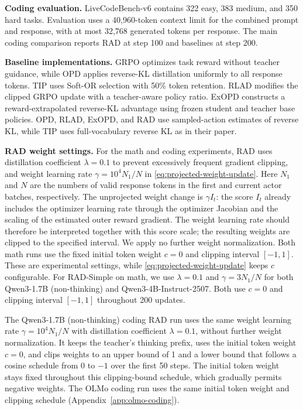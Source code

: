 \documentclass{article} %
\begin{document}
\noindent\textbf{Coding evaluation.}\enspace
LiveCodeBench-v6 contains 322 easy, 383 medium, and 350 hard tasks.
Evaluation uses a 40,960-token context limit for the combined prompt and
response, with at most 32,768 generated tokens per response. The main
coding comparison reports RAD at step 100 and baselines at step 200.


\noindent\textbf{Baseline implementations.}\enspace
GRPO optimizes task reward without teacher guidance, while OPD applies
reverse-KL distillation uniformly to all response tokens. TIP uses Soft-OR
selection with 50\% token retention. RLAD modifies the clipped GRPO update
with a teacher-aware policy ratio. ExOPD constructs a reward-extrapolated
reverse-KL advantage using frozen student and teacher base policies.
OPD, RLAD, ExOPD, and RAD use sampled-action estimates of reverse KL,
while TIP uses full-vocabulary reverse KL as in their paper.

\noindent\textbf{RAD weight settings.}\enspace
For the math and coding experiments, RAD uses distillation coefficient
\(\lambda=0.1\) to prevent excessively frequent gradient clipping, and weight learning rate \(\gamma=10^4 N_1/N\)
in \cref{eq:projected-weight-update}. Here \(N_1\) and \(N\) are the
numbers of valid response tokens in the first and current actor batches,
respectively.
The unprojected weight change is \(\gamma I_t\): the score \(I_t\) already
includes the optimizer learning rate through the optimizer Jacobian and
the scaling of the estimated outer reward gradient. The weight learning rate
should therefore be interpreted together with this score scale;
the resulting weights are clipped to the specified interval.
We apply no further weight normalization. Both math runs use the fixed initial
token weight \(c=0\) and clipping interval \([-1,1]\). These are experimental
settings, while \cref{eq:projected-weight-update} keeps \(c\) configurable.
For RAD-Simple on math, we use \(\lambda=0.1\) and
\(\gamma=3N_1/N\) for both Qwen3-1.7B (non-thinking) and Qwen3-4B-Instruct-2507.
Both use \(c=0\) and clipping interval \([-1,1]\) throughout 200 updates.

The Qwen3-1.7B (non-thinking) coding RAD run uses the same weight learning rate
\(\gamma=10^4 N_1/N\) with distillation coefficient \(\lambda=0.1\),
without further weight normalization. It keeps the teacher's thinking prefix,
uses the initial token weight \(c=0\), and clips weights to an upper bound of 1 and a lower
bound that follows a cosine schedule from 0 to \(-1\) over the first 50 steps.
The initial token weight stays fixed throughout this clipping-bound schedule,
which gradually permits negative weights. The OLMo coding run uses the same
initial token weight and clipping schedule (Appendix~\ref{app:olmo-coding}).
\end{document}
